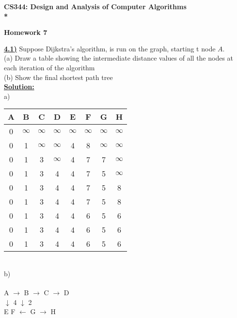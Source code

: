 \documentclass{article}
\begin{document}
\begin{center}
\bf{\LARGE CS344: Design and Analysis of Computer Algorithms} \\*

\vspace{0.2in}
{\bf {\Large Homework 7}}
\end{center}

\vspace{.2in}


\vspace{.2in}
\noindent \textbf{\underline{4.1)}} Suppose Dijkstra's algorithm, is run on the graph, starting t node $A$.\\

\indent (a) Draw a table showing the intermediate distance values of all the nodes at each iteration of the algorithm \\
\indent (b) Show the final shortest path tree \\

\noindent \textbf{\underline{Solution:}}  \\
a) \\
\begin{tabular}{ | c c c c c c c c |}
  \hline
  A & B & C & D & E & F & G & H\\ \hline
  0 & $\infty$ & $\infty$ & $\infty$ & $\infty$ & $\infty$ & $\infty$ & $\infty$ \\
  0 & 1 & $\infty$ & $\infty$ & 4 & 8 & $\infty$ & $\infty$\\
  0 & 1 & 3 & $\infty$ & 4 & 7 & 7 & $\infty$\\
  0 & 1 & 3 & 4 & 4 & 7 & 5 & $\infty$\\
  0 & 1 & 3 & 4 & 4 & 7 & 5 & 8\\
  0 & 1 & 3 & 4 & 4 & 7 & 5 & 8\\
  0 & 1 & 3 & 4 & 4 & 6 & 5 & 6\\
  0 & 1 & 3 & 4 & 4 & 6 & 5 & 6\\
  0 & 1 & 3 & 4 & 4 & 6 & 5 & 6\\
  \hline
\end{tabular} \\

\vspace{.2in}
\noindent b) \\
   \\
     A   $\rightarrow$    B         $\rightarrow$          C         $\rightarrow$        D\\
      $\downarrow$ 4 \indent \indent $\downarrow$ 2 \\
      E \indent F $\leftarrow$ G $\rightarrow$ H\\
\indent {} \indent {}\\
\end{document}
